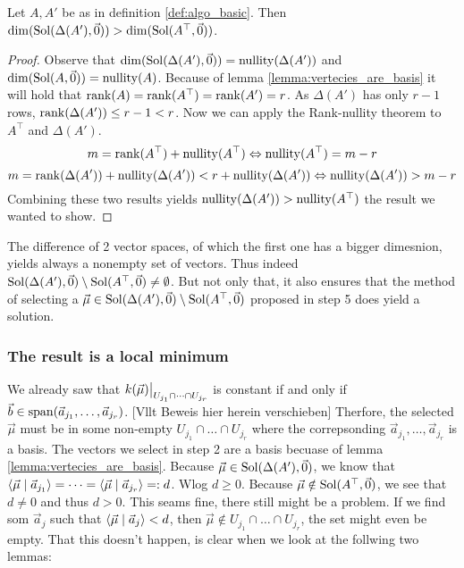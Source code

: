 \begin{lemma}
    Let $A, A'$ be as in definition \ref{def:algo_basic}. Then $\dim(\operatorname{Sol}(\Delta(A'), \vec0)) > \dim(\operatorname{Sol}(A^\top, \vec0))$.
\end{lemma}
\begin{proof}
    Observe that $\dim(\operatorname{Sol}(\Delta(A'), \vec0)) = \operatorname{nullity}(\Delta(A'))$ and $\dim(\operatorname{Sol}(A, \vec0)) = \operatorname{nullity}(A)$. Because of lemma \ref{lemma:vertecies_are_basis} it will hold that $\operatorname{rank}(A) = \operatorname{rank}(A^\top) = \operatorname{rank}(A') = r$. As $\Delta(A')$ has only $r-1$ rows, $\operatorname{rank}(\Delta(A')) \leq r-1 < r$. Now we can apply the Rank-nullity theorem to $A^\top$ and $\Delta(A')$.
    $$m = \operatorname{rank}(A^\top) + \operatorname{nullity}(A^\top) \Leftrightarrow \operatorname{nullity}(A^\top) = m - r$$
    $$m = \operatorname{rank}(\Delta(A')) + \operatorname{nullity}(\Delta(A')) < r + \operatorname{nullity}(\Delta(A'))\Leftrightarrow \operatorname{nullity}(\Delta(A')) > m - r$$
    Combining these two results yields $\operatorname{nullity}(\Delta(A')) > \operatorname{nullity}(A^\top)$ the result we wanted to show.
\end{proof}
The difference of 2 vector spaces, of which the first one has a bigger dimesnion, yields always a nonempty set of vectors. Thus indeed $\operatorname{Sol}(\Delta(A'), \vec0) \setminus \operatorname{Sol}(A^\top, \vec0) \neq \emptyset$. But not only that, it also ensures that the method of selecting a $\vec\mu \in \operatorname{Sol}(\Delta(A'), \vec0) \setminus \operatorname{Sol}(A^\top, \vec0)$ proposed in step 5 does yield a solution.

\subsubsection{The result is a local minimum}
We already saw that $\restrict{k(\vec\mu)}{U_{j_1} \cap \dots \cap U_{j_r}}$ is constant if and only if $\vec b \in \operatorname{span}(\vec a_{j_1}, \dots, \vec a_{j_r})$. [Vllt Beweis hier herein verschieben] Therfore, the selected $\vec\mu$ must be in some non-empty $U_{j_1} \cap \dots \cap U_{j_r}$ where the correpsonding $\vec a_{j_1}, \dots, \vec a_{j_r}$ is a basis. The vectors we select in step 2 are a basis becuase of lemma \ref{lemma:vertecies_are_basis}. Because $\vec\mu \in \operatorname{Sol}(\Delta(A'), \vec0)$, we know that $\langle \vec\mu \mid \vec a_{j_1} \rangle = \dots = \langle \vec\mu \mid \vec a_{j_r} \rangle =: d$. Wlog $d \geq 0$. Because $\vec\mu \notin \operatorname{Sol}(A^\top, \vec0)$, we see that $d \neq 0$ and thus $d > 0$. This seams fine, there still might be a problem. If we find som $\vec a_j$ such that $\langle \vec\mu \mid \vec a_j \rangle < d$, then $\vec\mu \notin U_{j_1} \cap \dots \cap U_{j_r}$, the set might even be empty. That this doesn't happen, is clear when we look at the follwing two lemmas:

